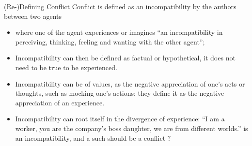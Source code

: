 \documentclass[aspectratio=169]{beamer}
\begin{document}
\begin{frame}{(Re-)Defining Conflict}
    Conflict is defined as an incompatibility by the authors between two agents
    \begin{itemize}
        \item where one of the agent experiences or imagines ``an incompatibility in perceiving, thinking, feeling and wanting with the other agent'';
        \item Incompatibility can then be defined as factual or hypothetical, it does not need to be true to be experienced.
        \item Incompatibility can be of values, as the negative appreciation of one's acts or thoughts, such as mocking one's actions: they define it as the negative appreciation of an experience.
        \item Incompatibility can root itself in the divergence of experience: ``I am a worker, you are the company's boss daughter, we are from different worlds.'' is an incompatibility, and a such should be a conflict ?
    \end{itemize}
\end{frame}
\end{document}
